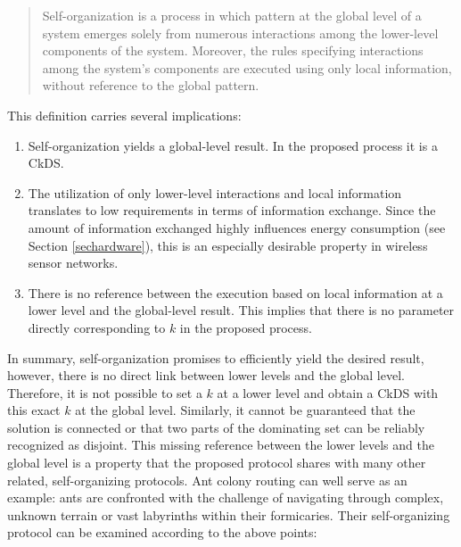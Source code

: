 \begin{quote}
Self-organization is a process in which pattern at the global level of a system emerges solely from numerous interactions among the lower-level components of the system. Moreover, the rules specifying interactions among the system's components are executed using only local information, without reference to the global pattern.
\end{quote}

This definition carries several implications:

\begin{enumerate}

	\item Self-organization yields a global-level result. In the proposed process it is a CkDS.
	
	\item The utilization of only lower-level interactions and local information translates to low requirements in terms of information exchange. Since the amount of information exchanged highly influences energy consumption (see Section \ref{sechardware}), this is an especially desirable property in wireless sensor networks.
	
	\item There is no reference between the execution based on local information at a lower level and the global-level result. This implies that there is no parameter directly corresponding to $k$ in the proposed process.

\end{enumerate}

In summary, self-organization promises to efficiently yield the desired result, however, there is no direct link between lower levels and the global level. Therefore, it is not possible to set a $k$ at a lower level and obtain a CkDS with this exact $k$ at the global level. Similarly, it cannot be guaranteed that the solution is connected or that two parts of the dominating set can be reliably recognized as disjoint. This missing reference between the lower levels and the global level is a property that the proposed protocol shares with many other related, self-organizing protocols. Ant colony routing \cite{bonabeauDT99intelligence} can well serve as an example: ants are confronted with the challenge of navigating through complex, unknown terrain or vast labyrinths within their formicaries. Their self-organizing protocol can be examined according to the above points:

